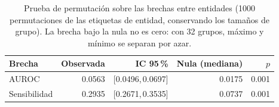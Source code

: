 
\begin{table}[htbp]
\centering
\small
\caption{Prueba de permutación sobre las brechas entre entidades
(1000 permutaciones de las etiquetas de entidad, conservando
los tamaños de grupo). La brecha bajo la nula no es cero: con 32 grupos, máximo y
mínimo se separan por azar.}
\label{tab:permutacion}
\begin{tabular}{l r r r r}
\toprule
Brecha & Observada & IC 95\,\% & Nula (mediana) & $p$ \\
\midrule
AUROC & 0.0563 & [0.0496,\,0.0697] & 0.0175 & 0.001 \\
Sensibilidad & 0.2935 & [0.2671,\,0.3535] & 0.0737 & 0.001 \\
\bottomrule
\end{tabular}
\end{table}
